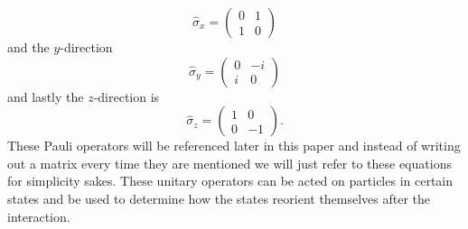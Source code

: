 \documentclass[twocolumn]{article}
\begin{document}
\begin{equation}\label{eq:13}
\hat{\sigma}_x=
\begin{pmatrix}
0 & 1 \\
1 & 0
\end{pmatrix}
\end{equation}
and the $y$-direction
\begin{equation}\label{eq:14}
\hat{\sigma}_y=
\begin{pmatrix}
0 & -i \\
i & 0
\end{pmatrix}
\end{equation}
and lastly the $z$-direction is
\begin{equation}\label{eq:15}
\hat{\sigma}_z=
\begin{pmatrix}
1 & 0 \\
0 & -1
\end{pmatrix}.
\end{equation}
These Pauli operators will be referenced later in this paper and instead of writing out a matrix every time they are mentioned we will just refer to these equations for simplicity sakes. These unitary operators can be acted on particles in certain states and be used to determine how the states reorient themselves after the interaction.
\end{document}
